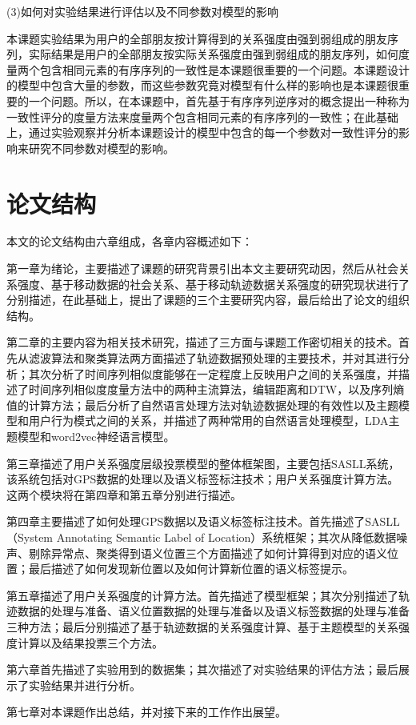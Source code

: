 \par (3)如何对实验结果进行评估以及不同参数对模型的影响
\par 本课题实验结果为用户的全部朋友按计算得到的关系强度由强到弱组成的朋友序列，实际结果是用户的全部朋友按实际关系强度由强到弱组成的朋友序列，如何度量两个包含相同元素的有序序列的一致性是本课题很重要的一个问题。本课题设计的模型中包含大量的参数，而这些参数究竟对模型有什么样的影响也是本课题很重要的一个问题。所以，在本课题中，首先基于有序序列逆序对的概念提出一种称为一致性评分的度量方法来度量两个包含相同元素的有序序列的一致性；在此基础上，通过实验观察并分析本课题设计的模型中包含的每一个参数对一致性评分的影响来研究不同参数对模型的影响。

\section{论文结构}
本文的论文结构由六章组成，各章内容概述如下：
\par 第一章为绪论，主要描述了课题的研究背景引出本文主要研究动因，然后从社会关系强度、基于移动数据的社会关系、基于移动轨迹数据关系强度的研究现状进行了分别描述，在此基础上，提出了课题的三个主要研究内容，最后给出了论文的组织结构。
\par 第二章的主要内容为相关技术研究，描述了三方面与课题工作密切相关的技术。首先从滤波算法和聚类算法两方面描述了轨迹数据预处理的主要技术，并对其进行分析；其次分析了时间序列相似度能够在一定程度上反映用户之间的关系强度，并描述了时间序列相似度度量方法中的两种主流算法，编辑距离和DTW，以及序列熵值的计算方法；最后分析了自然语言处理方法对轨迹数据处理的有效性以及主题模型和用户行为模式之间的关系，并描述了两种常用的自然语言处理模型，LDA主题模型和word2vec神经语言模型。
\par 第三章描述了用户关系强度层级投票模型的整体框架图，主要包括SASLL系统，该系统包括对GPS数据的处理以及语义标签标注技术；用户关系强度计算方法。这两个模块将在第四章和第五章分别进行描述。
\par 第四章主要描述了如何处理GPS数据以及语义标签标注技术。首先描述了SASLL（System Annotating Semantic Label of Location）系统框架；其次从降低数据噪声、剔除异常点、聚类得到语义位置三个方面描述了如何计算得到对应的语义位置；最后描述了如何发现新位置以及如何计算新位置的语义标签提示。
\par 第五章描述了用户关系强度的计算方法。首先描述了模型框架；其次分别描述了轨迹数据的处理与准备、语义位置数据的处理与准备以及语义标签数据的处理与准备三种方法；最后分别描述了基于轨迹数据的关系强度计算、基于主题模型的关系强度计算以及结果投票三个方法。
\par 第六章首先描述了实验用到的数据集；其次描述了对实验结果的评估方法；最后展示了实验结果并进行分析。
\par 第七章对本课题作出总结，并对接下来的工作作出展望。
